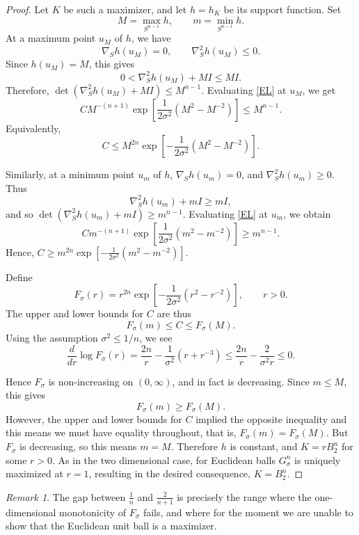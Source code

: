 \documentclass[12pt,oneside,reqno]{amsart}
\numberwithin{equation}{section}
\theoremstyle{remark}
\newtheorem{remark}[theorem]{Remark}
\begin{document}
\begin{proof}
Let \(K\) be such a maximizer, and let \(h=h_K\) be its support function.
Set
\[
        M=\max_{S^{n-1}}h,
        \qquad
        m=\min_{S^{n-1}}h.
\]
At a maximum point \(u_M\) of \(h\), we have
\[
        \nabla_Sh(u_M)=0,
        \qquad
        \nabla_S^2h(u_M)\le0.
\]
Since \(h(u_M)=M\), this gives
\[
        0<\nabla_S^2h(u_M)+MI\le MI.
\]
Therefore, $\det(\nabla_S^2h(u_M)+MI)\le M^{n-1}$.
Evaluating \eqref{EL} at \(u_M\), we get
\[
        C M^{-(n+1)}
        \exp\left[
        \frac{1}{2\sigma^2}(M^2-M^{-2})
        \right]
        \le
        M^{n-1}.
\]
Equivalently,
\[
        C
        \le
        M^{2n}
        \exp\left[
        -\frac{1}{2\sigma^2}(M^2-M^{-2})
        \right].
\]

Similarly, at a minimum point \(u_m\) of \(h\),
$\nabla_Sh(u_m)=0$, and
$ \nabla_S^2h(u_m)\ge0$. Thus
\[
        \nabla_S^2h(u_m)+mI\ge mI,
\]
and so $\det(\nabla_S^2h(u_m)+mI)\ge m^{n-1}$.
Evaluating \eqref{EL} at \(u_m\), we obtain
\[
        C m^{-(n+1)}
        \exp\left[
        \frac{1}{2\sigma^2}(m^2-m^{-2})
        \right]
        \ge
        m^{n-1}.
\]
Hence, $C \ge m^{2n} \exp\left[ -\frac{1}{2\sigma^2}(m^2-m^{-2})\right]$.

Define
\[
        F_\sigma(r)
        =
        r^{2n}
        \exp\left[
        -\frac{1}{2\sigma^2}(r^2-r^{-2})
        \right],
        \qquad r>0.
\]
The upper and lower bounds for $C$ are thus 
\[
        F_\sigma(m)\le C\le F_\sigma(M).
\]
Using the assumption \(\sigma^2\le 1/n\), we see
\[
        \frac{d}{dr}\log F_\sigma(r)
        =
        \frac{2n}{r}
        -
    \frac{1}{\sigma^2}(r+r^{-3})\le \frac{2n}{r}
        -
        \frac{2}{\sigma^2r}
        \le0.
\]

Hence \(F_\sigma\) is non-increasing on \((0,\infty)\), and in fact is decreasing. Since \(m\le M\), this gives
\[
        F_\sigma(m)\ge F_\sigma(M).
\]
However, the upper and lower bounds for $C$ implied the opposite inequality and this means we must have equality throughout, that is, 
$
        F_\sigma(m)=F_\sigma(M)$. But 
\(F_\sigma\) is decreasing, so this means $
        m=M$.
Therefore \(h\) is constant, and \(K=rB_2^n\) for some \(r>0\). As in the two dimensional case, for Euclidean balls $G^n_\sigma$
is uniquely maximized at \(r=1\), resulting in the desired consequence,  \(K=B_2^n\).
\end{proof}

\begin{remark}
The gap between \(\frac1n\) and \(\frac2{n+1}\) is precisely the range where the
one-dimensional monotonicity of \(F_\sigma\) fails, and where for the moment we are unable to show that the Euclidean unit ball is a maximizer. 
\end{remark}






\end{document}
